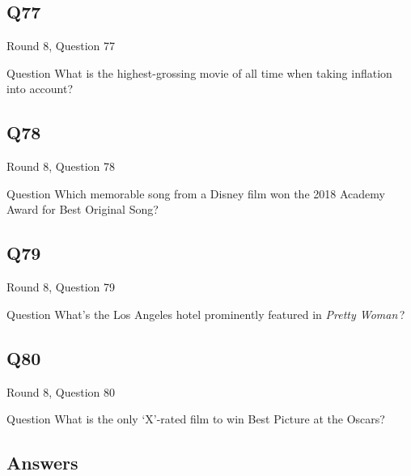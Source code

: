 \documentclass[11pt]{beamer}
\begin{document}
\subsection*{Q77}
\begin{frame}[t]{Round 8, Question 77}
\vspace{2em}
\begin{block}{Question}
What is the highest-grossing movie of all time when taking inflation into account?
\end{block}
\end{frame}
    

\subsection*{Q78}
\begin{frame}[t]{Round 8, Question 78}
\vspace{2em}
\begin{block}{Question}
Which memorable song from a Disney film won the 2018 Academy Award for Best Original Song?
\end{block}
\end{frame}
    

\subsection*{Q79}
\begin{frame}[t]{Round 8, Question 79}
\vspace{2em}
\begin{block}{Question}
What's the Los Angeles hotel prominently featured in \emph{Pretty Woman}\,?
\end{block}
\end{frame}
    

\subsection*{Q80}
\begin{frame}[t]{Round 8, Question 80}
\vspace{2em}
\begin{block}{Question}
What is the only `X'-rated film to win Best Picture at the Oscars?
\end{block}
\end{frame}
    
\subsection{Answers}
\end{document}
